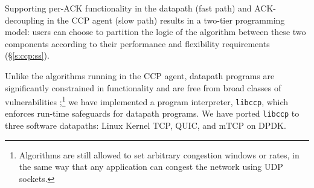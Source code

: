 
%


 


 
Supporting per-ACK functionality in the datapath (fast path) and ACK-decoupling in the CCP agent (slow path) results in a two-tier programming model:
%
users can choose to partition the logic of the algorithm between these two components according to their performance and flexibility requirements (\S\ref{s:ccp:ss}).

%
Unlike the algorithms running in the CCP agent, datapath programs are significantly constrained in functionality and are free from broad classes of vulnerabilities ;\footnote{Algorithms are still allowed to set arbitrary congestion windows or rates, in the same way that any application can congest the network using UDP sockets.
}
%
we have implemented a program interpreter, {\tt libccp}, which enforces run-time safeguards for datapath programs. We have ported {\tt libccp} to three software datapaths: Linux Kernel TCP, QUIC, and mTCP on DPDK.


 

